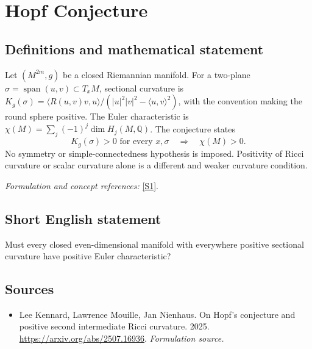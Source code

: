 \documentclass[11pt]{article}
\begin{document}
\section*{\texorpdfstring{Hopf Conjecture}{Hopf Conjecture}}\label{statement}
\subsection{Definitions and mathematical statement}
Let $(M^{2m},g)$ be a closed Riemannian manifold. For a two-plane $\sigma=\operatorname{span}(u,v)\subset T_xM$, sectional curvature is
$K_g(\sigma)=\langle R(u,v)v,u\rangle/(|u|^2|v|^2-\langle u,v\rangle^2)$, with the convention making the round sphere positive. The Euler characteristic is
$\chi(M)=\sum_j(-1)^j\dim H_j(M,{\mathbb{Q}})$. The conjecture states
\[
 K_g(\sigma)>0\text{ for every }x,\sigma
 \quad\Longrightarrow\quad\chi(M)>0.
\]
No symmetry or simple-connectedness hypothesis is imposed. Positivity of Ricci curvature or scalar curvature alone is a different and weaker curvature condition.
\par\smallskip\textit{Formulation and concept references:} \href{https://arxiv.org/abs/2507.16936}{[S1]}.

\subsection{Short English statement}
Must every closed even-dimensional manifold with everywhere positive sectional curvature have positive Euler characteristic?
\subsection{Sources}
\begin{itemize}
\item[S1]Lee Kennard, Lawrence Mouille, Jan Nienhaus. On Hopf's conjecture and positive second intermediate Ricci curvature. 2025.
\url{https://arxiv.org/abs/2507.16936}.
\textit{Formulation source.}
\end{itemize}
\end{document}
